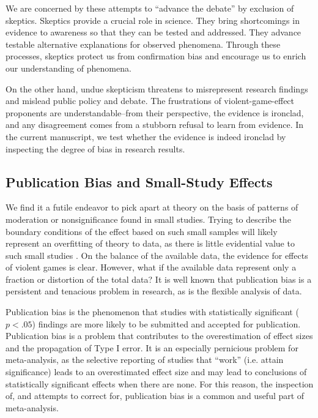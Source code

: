 \documentclass[man]{apa6}
\begin{document}
We are concerned by these attempts to ``advance the debate'' by exclusion of skeptics. Skeptics provide a crucial role in science. They bring shortcomings in evidence to awareness so that they can be tested and addressed. They advance testable alternative explanations for observed phenomena. Through these processes, skeptics protect us from confirmation bias and encourage us to enrich our understanding of phenomena.

On the other hand, undue skepticism threatens to misrepresent research findings and mislead public policy and debate. The frustrations of violent-game-effect proponents are understandable--from their perspective, the evidence is ironclad, and any disagreement comes from a stubborn refusal to learn from evidence. In the current manuscript, we test whether the evidence is indeed ironclad by inspecting the degree of bias in research results.

\subsection{Publication Bias and Small-Study Effects}
We find it a futile endeavor to pick apart at theory on the basis of patterns of moderation or nonsignificance found in small studies. Trying to describe the boundary conditions of the effect based on such small samples will likely represent an overfitting of theory to data, as there is little evidential value to such small studies \citep{Hilgard:etal:2014}.
On the balance of the available data, the evidence for effects of violent games is clear.
However, what if the available data represent only a fraction or distortion of the total data? 
It is well known that publication bias is a persistent and tenacious problem in research, as is the flexible analysis of data.

Publication bias is the phenomenon that studies with statistically significant ($p<.05$) findings are more likely to be submitted and accepted for publication. Publication bias is a problem that contributes to the overestimation of effect sizes and the propagation of Type I error. It is an especially pernicious problem for meta-analysis, as the selective reporting of studies that ``work'' (i.e. attain significance) leads to an overestimated effect size and may lead to conclusions of statistically significant effects when there are none. For this reason, the inspection of, and attempts to correct for, publication bias is a common and useful part of meta-analysis.
\end{document}
